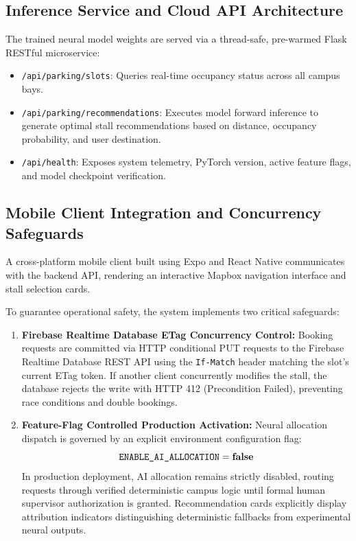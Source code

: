 \documentclass[journal]{IEEEtran}
\begin{document}
\subsection{Inference Service and Cloud API Architecture}
The trained neural model weights are served via a thread-safe, pre-warmed Flask RESTful microservice:
\begin{itemize}
    \item \texttt{/api/parking/slots}: Queries real-time occupancy status across all campus bays.
    \item \texttt{/api/parking/recommendations}: Executes model forward inference to generate optimal stall recommendations based on distance, occupancy probability, and user destination.
    \item \texttt{/api/health}: Exposes system telemetry, PyTorch version, active feature flags, and model checkpoint verification.
\end{itemize}

\subsection{Mobile Client Integration and Concurrency Safeguards}
A cross-platform mobile client built using Expo and React Native communicates with the backend API, rendering an interactive Mapbox navigation interface and stall selection cards.

To guarantee operational safety, the system implements two critical safeguards:
\begin{enumerate}
    \item \textbf{Firebase Realtime Database ETag Concurrency Control:} Booking requests are committed via HTTP conditional PUT requests to the Firebase Realtime Database REST API using the \texttt{If-Match} header matching the slot's current ETag token. If another client concurrently modifies the stall, the database rejects the write with HTTP 412 (Precondition Failed), preventing race conditions and double bookings.
    \item \textbf{Feature-Flag Controlled Production Activation:} Neural allocation dispatch is governed by an explicit environment configuration flag:
    \begin{equation}
    \texttt{ENABLE\_AI\_ALLOCATION} = \text{\textbf{false}}
    \end{equation}
    In production deployment, AI allocation remains strictly disabled, routing requests through verified deterministic campus logic until formal human supervisor authorization is granted. Recommendation cards explicitly display attribution indicators distinguishing deterministic fallbacks from experimental neural outputs.
\end{enumerate}
\end{document}
